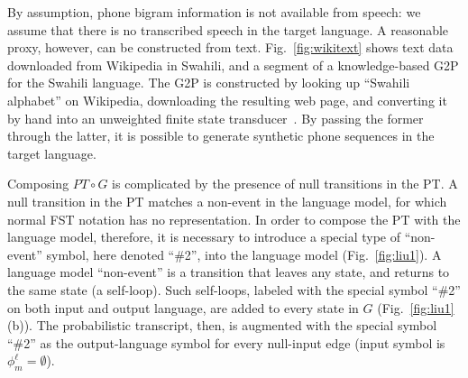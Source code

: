 By assumption, phone bigram information is not available from speech:
we assume that there is no transcribed speech in the target language.
A reasonable proxy, however, can be constructed from text.
Fig.~\ref{fig:wikitext} shows text data downloaded from Wikipedia in
Swahili, and a segment of a knowledge-based G2P for the Swahili
language.  {\color{blue} The G2P is constructed by looking up
  ``Swahili alphabet'' on Wikipedia, downloading the resulting web
  page, and converting it by hand into an unweighted finite state
  transducer~\cite{Hasegawajohnson15}.}  By passing the former through
the latter, it is possible to generate synthetic phone sequences in
the target language.

Composing $PT\circ G$ is complicated by the presence of null
transitions in the PT.  A null transition in the PT matches a
non-event in the language model, for which normal FST notation has no
representation. In order to compose the PT with the language model,
therefore, it is necessary to introduce a special type of
``non-event'' symbol, here denoted ``\#2'', into the language model
(Fig.~\ref{fig:liu1}).  A language
model ``non-event'' is a transition that leaves any state, and returns
to the same state (a self-loop).  Such self-loops, labeled with the
special symbol ``\#2'' on both input and output language, are added to
every state in $G$ (Fig.~\ref{fig:liu1} (b)).
The probabilistic transcript, then, is
augmented with the special symbol ``\#2'' as the output-language symbol
for every null-input edge (input symbol is $\phi_m^\ell =\emptyset$).
